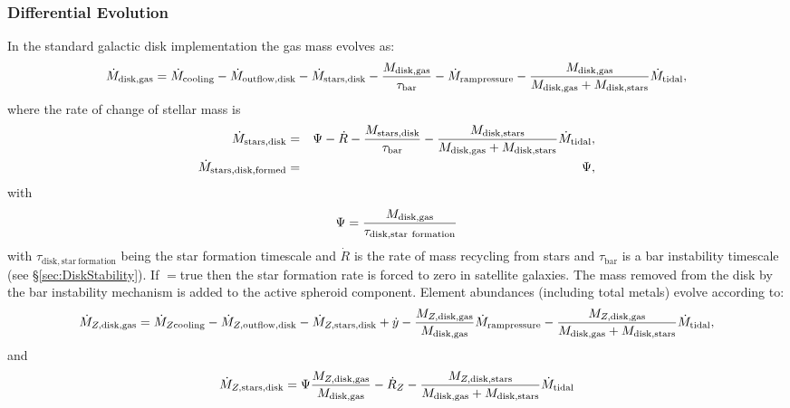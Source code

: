 \subsubsection{Differential Evolution}

In the standard galactic disk implementation the gas mass evolves as:
\begin{equation}
 \dot{M}_\mathrm{disk, gas} = \dot{M}_\mathrm{cooling} - \dot{M}_\mathrm{outflow, disk} - \dot{M}_\mathrm{stars, disk} - {M_\mathrm{disk, gas}\over \tau_\mathrm{bar}} - \dot{M}_\mathrm{ram pressure} - {M_\mathrm{disk, gas} \over M_\mathrm{disk, gas} + M_\mathrm{disk, stars}} \dot{M}_\mathrm{tidal},
\end{equation}
where the rate of change of stellar mass is
\begin{eqnarray}
  \dot{M}_\mathrm{stars, disk} &=& \Psi - \dot{R} - {M_\mathrm{stars,disk} \over \tau_\mathrm{bar}} - {M_\mathrm{disk, stars} \over M_\mathrm{disk, gas} + M_\mathrm{disk, stars}} \dot{M}_\mathrm{tidal}, \\
  \dot{M}_\mathrm{stars, disk, formed } &=& \Psi,
\end{eqnarray}
with
\begin{equation}
 \Psi = {M_\mathrm{disk, gas} \over \tau_\mathrm{disk, star~formation}}
\end{equation}
with $\tau_\mathrm{disk, star~formation}$ being the star formation timescale and $\dot{R}$ is the rate of mass recycling from stars and $\tau_\mathrm{bar}$ is a bar instability timescale (see \S\ref{sec:DiskStability}). If {\normalfont \ttfamily [diskStarFormationInSatellites]}$=${\normalfont \ttfamily true} then the star formation rate is forced to zero in satellite galaxies. The mass removed from the disk by the bar instability mechanism is added to the active spheroid component.
Element abundances (including total metals) evolve according to:
\begin{equation}
  \dot{M}_{Z, \mathrm{disk, gas}} = \dot{M}_{Z \mathrm{cooling}} - \dot{M}_{Z, \mathrm{outflow, disk}} - \dot{M}_{Z, \mathrm{stars, disk}} + \dot{y} - {M_{Z, \mathrm{disk, gas}} \over M_\mathrm{disk, gas}} \dot{M}_\mathrm{ram pressure} - {M_{Z, \mathrm{disk, gas}} \over M_\mathrm{disk, gas} + M_\mathrm{disk, stars}} \dot{M}_\mathrm{tidal},
\end{equation}
and
\begin{equation}
 \dot{M}_{Z, \mathrm{stars, disk}} = \Psi {M_{Z, \mathrm{disk, gas}} \over M_\mathrm{disk, gas}} - \dot{R}_Z - {M_{Z, \mathrm{disk, stars}} \over M_\mathrm{disk, gas} + M_\mathrm{disk, stars}} \dot{M}_\mathrm{tidal}
\end{equation}

